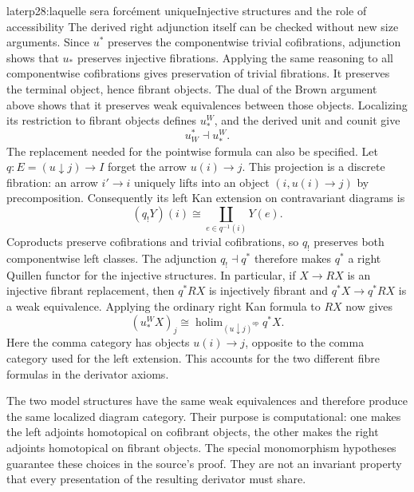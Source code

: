 \begin{dcomment}{later}{p28:laquelle sera forcément unique}{Injective structures and the role of accessibility}
The derived right adjunction itself can be checked without new size arguments. Since $u^*$ preserves the componentwise trivial cofibrations, adjunction shows that $u_*$ preserves injective fibrations. Applying the same reasoning to all componentwise cofibrations gives preservation of trivial fibrations. It preserves the terminal object, hence fibrant objects. The dual of the Brown argument above shows that it preserves weak equivalences between those objects. Localizing its restriction to fibrant objects defines $u_*^W$, and the derived unit and counit give
\[
 u_W^*\dashv u_*^W.
\]
The replacement needed for the pointwise formula can also be specified. Let $q:E=(u\downarrow j)\to I$ forget the arrow $u(i)\to j$. This projection is a discrete fibration: an arrow $i'\to i$ uniquely lifts into an object $(i,u(i)\to j)$ by precomposition. Consequently its left Kan extension on contravariant diagrams is
\[
 (q_!Y)(i)\cong\coprod_{e\in q^{-1}(i)}Y(e).
\]
Coproducts preserve cofibrations and trivial cofibrations, so $q_!$ preserves both componentwise left classes. The adjunction $q_!\dashv q^*$ therefore makes $q^*$ a right Quillen functor for the injective structures. In particular, if $X\to RX$ is an injective fibrant replacement, then $q^*RX$ is injectively fibrant and $q^*X\to q^*RX$ is a weak equivalence. Applying the ordinary right Kan formula to $RX$ now gives
\[
 (u_*^WX)_j\cong
 \operatorname{holim}_{(u\downarrow j)^{\mathrm{op}}}q^*X.
\]
Here the comma category has objects $u(i)\to j$, opposite to the comma category used for the left extension. This accounts for the two different fibre formulas in the derivator axioms.

The two model structures have the same weak equivalences and therefore produce the same localized diagram category. Their purpose is computational: one makes the left adjoints homotopical on cofibrant objects, the other makes the right adjoints homotopical on fibrant objects. The special monomorphism hypotheses guarantee these choices in the source's proof. They are not an invariant property that every presentation of the resulting derivator must share.
\end{dcomment}

